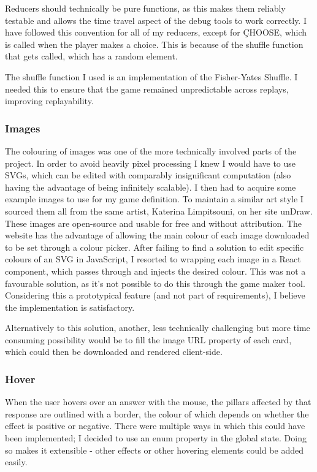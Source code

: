 Reducers should technically be pure functions, as this makes them reliably testable and allows the time travel aspect of the debug tools to work correctly. 
I have followed this convention for all of my reducers, except for \c{CHOOSE}, which is called when the player makes a choice. 
This is because of the shuffle function that gets called, which has a random element.

The shuffle function I used is an implementation of the Fisher-Yates Shuffle\cite{Shuffle}. 
I needed this to ensure that the game remained unpredictable across replays, improving replayability.

\subsubsection{Images}
The colouring of images was one of the more technically involved parts of the project. 
In order to avoid heavily pixel processing I knew I would have to use SVGs, which can be edited with comparably insignificant computation (also having the advantage of being infinitely scalable). 
I then had to acquire some example images to use for my game definition. 
To maintain a similar art style I sourced them all from the same artist, Katerina Limpitsouni, on her site unDraw\cite{Undraw}. These images are open-source and usable for free and without attribution. 
The website has the advantage of allowing the main colour of each image downloaded to be set through a colour picker. 
After failing to find a solution to edit specific colours of an SVG in JavaScript, I resorted to wrapping each image in a React component, which passes through and injects the desired colour. 
This was not a favourable solution, as it's not possible to do this through the game maker tool. 
Considering this a prototypical feature (and not part of requirements), I believe the implementation is satisfactory.

Alternatively to this solution, another, less technically challenging but more time consuming possibility would be to fill the image URL property of each card, which could then be downloaded and rendered client-side.

\subsubsection{Hover}
When the user hovers over an answer with the mouse, the pillars affected by that response are outlined with a border, the colour of which depends on whether the effect is positive or negative. 
There were multiple ways in which this could have been implemented; I decided to use an enum property in the global state. 
Doing so makes it extensible - other effects or other hovering elements could be added easily.